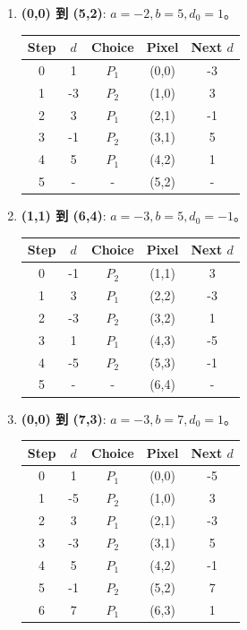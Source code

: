 \documentclass[UTF8]{ctexart}
\begin{document}
\begin{enumerate}
    \item \textbf{(0,0) 到 (5,2)}: $a=-2, b=5, d_0=1$。
    \begin{center}
    \begin{tabular}{ccccc}
    \toprule Step & $d$ & Choice & Pixel & Next $d$ \\ \midrule
    0 & 1 & $P_1$ & (0,0) & -3 \\
    1 & -3 & $P_2$ & (1,0) & 3 \\ 2 & 3 & $P_1$ & (2,1) & -1 \\
    3 & -1 & $P_2$ & (3,1) & 5 \\ 4 & 5 & $P_1$ & (4,2) & 1 \\
    5 & - & - & (5,2) & - \\ \bottomrule
    \end{tabular}
    \end{center}
    \item \textbf{(1,1) 到 (6,4)}: $a=-3, b=5, d_0=-1$。
    \begin{center}
    \begin{tabular}{ccccc}
    \toprule Step & $d$ & Choice & Pixel & Next $d$ \\ \midrule
    0 & -1 & $P_2$ & (1,1) & 3 \\
    1 & 3 & $P_1$ & (2,2) & -3 \\ 2 & -3 & $P_2$ & (3,2) & 1 \\
    3 & 1 & $P_1$ & (4,3) & -5 \\ 4 & -5 & $P_2$ & (5,3) & -1 \\
    5 & - & - & (6,4) & - \\ \bottomrule
    \end{tabular}
    \end{center}
    \item \textbf{(0,0) 到 (7,3)}: $a=-3, b=7, d_0=1$。
    \begin{center}
    \begin{tabular}{ccccc}
    \toprule Step & $d$ & Choice & Pixel & Next $d$ \\ \midrule
    0 & 1 & $P_1$ & (0,0) & -5 \\
    1 & -5 & $P_2$ & (1,0) & 3 \\ 2 & 3 & $P_1$ & (2,1) & -3 \\
    3 & -3 & $P_2$ & (3,1) & 5 \\ 4 & 5 & $P_1$ & (4,2) & -1 \\
    5 & -1 & $P_2$ & (5,2) & 7 \\ 6 & 7 & $P_1$ & (6,3) & 1 \\ \bottomrule

\end{tabular}
\end{center}
\end{enumerate}
\end{document}
